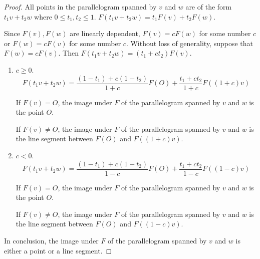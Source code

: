 \begin{proof}
    All points in the parallelogram spanned by $v$ and $w$ are of the form $t_{1}v + t_{2}w$ where $0 \leq t_{1}, t_{2} \leq 1$. $F(t_{1}v + t_{2}w) = t_{1}F(v) + t_{2}F(w)$.

    Since $F(v), F(w)$ are linearly dependent, $F(v) = cF(w)$ for some number $c$ or $F(w) = cF(v)$ for some number $c$. Without loss of generality, suppose that $F(w) = cF(v)$. Then $F(t_{1}v + t_{2}w) = (t_{1} + ct_{2})F(v)$.

    \begin{enumerate}[label={\textbf{Case \arabic*.}},itemindent=1cm]
        \item $c\geq 0$.
              \[
                  F(t_{1}v + t_{2}w) = \dfrac{(1-t_{1}) + c(1-t_{2})}{1+c}F(O) + \dfrac{t_{1} + ct_{2}}{1+c}F((1+c)v)
              \]

              If $F(v) = O$, the image under $F$ of the parallelogram spanned by $v$ and $w$ is the point $O$.

              If $F(v)\ne O$, the image under $F$ of the parallelogram spanned by $v$ and $w$ is the line segment between $F(O)$ and $F((1+c)v)$.
        \item $c < 0$.
              \[
                  F(t_{1}v + t_{2}w) = \frac{(1-t_{1}) + c(1-t_{2})}{1-c}F(O) + \frac{t_{1} + ct_{2}}{1 - c}F((1 - c)v)
              \]

              If $F(v) = O$, the image under $F$ of the parallelogram spanned by $v$ and $w$ is the point $O$.

              If $F(v)\ne O$, the image under $F$ of the parallelogram spanned by $v$ and $w$ is the line segment between $F(O)$ and $F((1-c)v)$.
    \end{enumerate}

    In conclusion, the image under $F$ of the parallelogram spanned by $v$ and $w$ is either a point or a line segment.
\end{proof}
